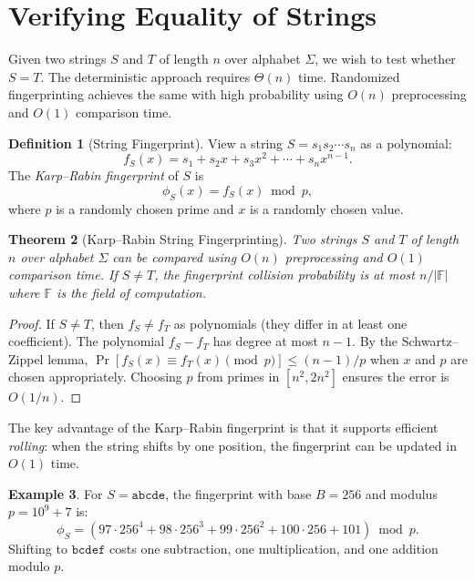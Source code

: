 \documentclass[twoside,12pt]{book}
\theoremstyle{plain}
\newtheorem{theorem}{Theorem}[chapter]
\theoremstyle{definition}
\newtheorem{definition}[theorem]{Definition}
\newtheorem{example}[theorem]{Example}
\theoremstyle{remark}
\begin{document}
\section{Verifying Equality of Strings}
\label{sec:string-equality}

Given two strings $S$ and $T$ of length $n$ over alphabet $\Sigma$, we wish to test whether $S = T$. The deterministic approach requires $\Theta(n)$ time. Randomized fingerprinting achieves the same with high probability using $O(n)$ preprocessing and $O(1)$ comparison time.

\begin{definition}[String Fingerprint]
View a string $S = s_1 s_2 \cdots s_n$ as a polynomial:
\[
f_S(x) = s_1 + s_2 x + s_3 x^2 + \cdots + s_n x^{n-1}.
\]
The \emph{Karp--Rabin fingerprint} of $S$ is
\[
\phi_S(x) = f_S(x) \bmod p,
\]
where $p$ is a randomly chosen prime and $x$ is a randomly chosen value.
\end{definition}

\begin{theorem}[Karp--Rabin String Fingerprinting]
\label{thm:kr-fingerprint}
Two strings $S$ and $T$ of length $n$ over alphabet $\Sigma$ can be compared using $O(n)$ preprocessing and $O(1)$ comparison time. If $S \neq T$, the fingerprint collision probability is at most $n/|\mathbb{F}|$ where $\mathbb{F}$ is the field of computation.
\end{theorem}

\begin{proof}
If $S \neq T$, then $f_S \neq f_T$ as polynomials (they differ in at least one coefficient). The polynomial $f_S - f_T$ has degree at most $n - 1$. By the Schwartz--Zippel lemma, $\Pr[f_S(x) \equiv f_T(x) \pmod{p}] \leq (n-1)/p$ when $x$ and $p$ are chosen appropriately. Choosing $p$ from primes in $[n^2, 2n^2]$ ensures the error is $O(1/n)$.
\end{proof}

The key advantage of the Karp--Rabin fingerprint is that it supports efficient \emph{rolling}: when the string shifts by one position, the fingerprint can be updated in $O(1)$ time.

\begin{example}
For $S = \texttt{abcde}$, the fingerprint with base $B = 256$ and modulus $p = 10^9 + 7$ is:
\[
\phi_S = (97 \cdot 256^4 + 98 \cdot 256^3 + 99 \cdot 256^2 + 100 \cdot 256 + 101) \bmod p.
\]
Shifting to $\texttt{bcdef}$ costs one subtraction, one multiplication, and one addition modulo $p$.
\end{example}
\end{document}
